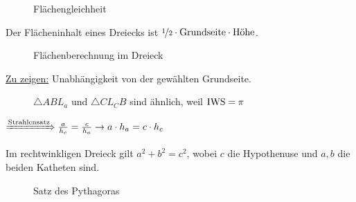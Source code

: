 \begin{figure}[ht]
    \centering
    \label{fig:flaechengleichheit}
    \caption{Flächengleichheit}
\end{figure}

Der Flächeninhalt eines Dreiecks ist $\nicefrac{1}{2} \cdot \text{Grundseite} \cdot \text{Höhe}$.

\begin{figure}[htp]
    \centering
    \caption{Flächenberechnung im Dreieck}
    \label{fig:flaechenberechnung-dreieck}
\end{figure}

\underline{Zu zeigen:} Unabhängigkeit von der gewählten Grundseite.

\begin{figure}[htp]
    \centering
    
    \caption{$\triangle ABL_a$ und $\triangle C{L_C}B$ sind ähnlich, weil $\operatorname{IWS} = \pi$}
    \label{fig:flaechenberechnung-dreieck-2}
\end{figure}

$\xRightarrow{\text{Strahlensatz}} \frac{a}{h_c} = \frac{c}{h_a} \rightarrow a \cdot h_a = c \cdot h_c$

\begin{satz}
    Im rechtwinkligen Dreieck gilt $a^2 + b^2 = c^2$, wobei $c$ die
    Hypothenuse und $a, b$ die beiden Katheten sind.
\end{satz}

\begin{figure}[ht]
    \centering
    \subfloat[Beweisskizze]{
        
        \label{fig:pythagoras-2}
    }%
    \label{fig:pythagoras}
    \caption{Satz des Pythagoras}
\end{figure}

